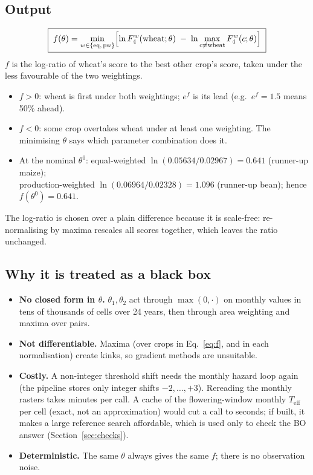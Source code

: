 \documentclass[11pt,a4paper]{article}
\numberwithin{equation}{section}
\newcommand{\Fd}{F_4}
\newcommand{\Teff}{T_{\text{eff}}}
\begin{document}
\subsection{Output}
\begin{equation}\label{eq:f}
\boxed{\;f(\theta)=\min_{w\in\{\text{eq},\,\text{pw}\}}\Bigl[\ln \Fd^{w}(\text{wheat};\theta)\;-\;
\ln\max_{c\neq\text{wheat}}\Fd^{w}(c;\theta)\Bigr]\;}
\end{equation}
$f$ is the log-ratio of wheat's score to the best other crop's score, taken under the less favourable of the two
weightings.
\begin{itemize}
\item $f>0$: wheat is first under both weightings; $e^{f}$ is its lead (e.g.\ $e^{f}=1.5$ means 50\% ahead).
\item $f<0$: some crop overtakes wheat under at least one weighting. The minimising $\theta$ says which
parameter combination does it.
\item At the nominal $\theta^{0}$: equal-weighted $\ln(0.05634/0.02967)=0.641$ (runner-up maize);\\
production-weighted $\ln(0.06964/0.02328)=1.096$ (runner-up bean); hence $f(\theta^0)=0.641$.
\end{itemize}
The log-ratio is chosen over a plain difference because it is scale-free: re-normalising by maxima rescales all
scores together, which leaves the ratio unchanged.

\subsection{Why it is treated as a black box}
\begin{itemize}
\item \textbf{No closed form in $\theta$.} $\theta_1,\theta_2$ act through $\max(0,\cdot)$ on monthly values in tens
of thousands of cells over 24 years, then through area weighting and maxima over pairs.
\item \textbf{Not differentiable.} Maxima (over crops in Eq.~\ref{eq:f}, and in each normalisation) create kinks, so
gradient methods are unsuitable.
\item \textbf{Costly.} A non-integer threshold shift needs the monthly hazard loop again (the pipeline stores only
integer shifts $-2,\dots,+3$). Rereading the monthly rasters takes minutes per call. A cache of the
flowering-window monthly $\Teff$ per cell (exact, not an approximation) would cut a call to seconds; if built, it
makes a large reference search affordable, which is used only to check the BO answer (Section~\ref{sec:checks}).
\item \textbf{Deterministic.} The same $\theta$ always gives the same $f$; there is no observation noise.
\end{itemize}
\end{document}
